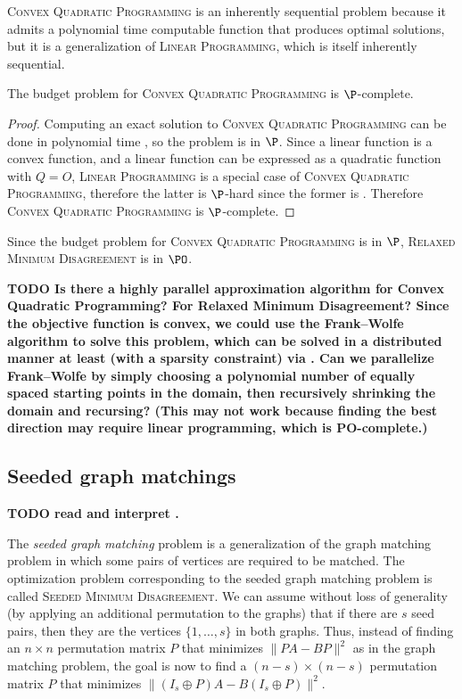 \documentclass{article}
\newcommand{\todo}[1]{\textbf{TODO #1}}
\newcommand{\1}{\mathbf{1}}
\newcommand{\RMD}{\textsc{Relaxed Minimum Disagreement}}
\newcommand{\CQP}{\textsc{Convex Quadratic Programming}}
\newcommand{\SMD}{\textsc{Seeded Minimum Disagreement}}
\begin{document}
\CQP{} is an inherently sequential problem because it admits a polynomial time computable function that produces optimal solutions, but it is a generalization of \textsc{Linear Programming}, which is itself inherently sequential.

\begin{theorem}
  The budget problem for \CQP{} is $\P$-complete.
\end{theorem}
\begin{proof}
  Computing an exact solution to \CQP{} can be done in polynomial time \autocite{gl90}, so the problem is in $\P$.
  Since a linear function is a convex function, and a linear function can be expressed as a quadratic function with $Q = O$, \textsc{Linear Programming} is a special case of \CQP{}, therefore the latter is $\P$-hard since the former is \autocite{ghr95}.
  Therefore \CQP{} is $\P$-complete.
\end{proof}

Since the budget problem for \CQP{} is in $\P$, \RMD{} is in $\PO$.

\todo{
  Is there a highly parallel approximation algorithm for Convex Quadratic Programming?
  For Relaxed Minimum Disagreement?
  Since the objective function is convex, we could use the Frank--Wolfe algorithm to solve this problem, which can be solved in a distributed manner at least (with a sparsity constraint) via \autocite{blgbs15}.
  Can we parallelize Frank--Wolfe by simply choosing a polynomial number of equally spaced starting points in the domain, then recursively shrinking the domain and recursing?
  (This may not work because finding the best direction may require linear programming, which is PO-complete.)}

\subsection{Seeded graph matchings}

\todo{read and interpret \autocite{lfp14, l14, lavpp14}.}

The \emph{seeded graph matching} problem is a generalization of the graph matching problem in which some pairs of vertices are required to be matched.
The optimization problem corresponding to the seeded graph matching problem is called \SMD{}.
We can assume without loss of generality (by applying an additional permutation to the graphs) that if there are $s$ seed pairs, then they are the vertices $\{1, \dotsc, s\}$ in both graphs.
Thus, instead of finding an $n \times n$ permutation matrix $P$ that minimizes $\| PA - BP \|^2$ as in the graph matching problem, the goal is now to find a $(n - s) \times (n - s)$ permutation matrix $P$ that minimizes $\| (I_s \oplus P) A - B (I_s \oplus P) \|^2$.
\end{document}
